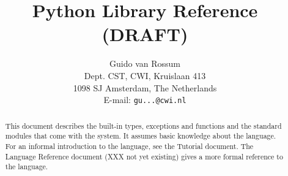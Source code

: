 

\newcommand{\itembreak}{
 \mbox{}\\*[0mm]
}

\newcommand{\funcitem}[2]{\item[#1(#2)]}

\newcommand{\excitem}[2]{
\item[#1 = {\tt '#2'}]
\itembreak
}

\title{\bf
 Python Library Reference \\
 (DRAFT)
}

\author{
 Guido van Rossum \\
 Dept. CST, CWI, Kruislaan 413 \\
 1098 SJ Amsterdam, The Netherlands \\
 E-mail: {\tt gu...@cwi.nl}
}




\maketitle

\begin{abstract}

\noindent
This document describes the built-in types, exceptions and functions and
the standard modules that come with the {\Python} system.
It assumes basic knowledge about the {\Python} language.
For an informal introduction to the language, see the Tutorial document.
The Language Reference document (XXX not yet existing)
gives a more formal reference to the language.

\end{abstract}

\pagebreak

\tableofcontents

\pagebreak







